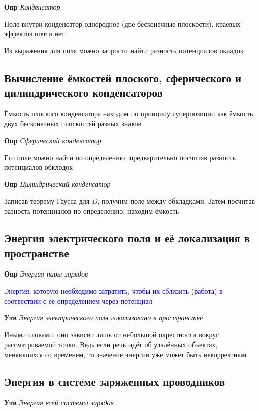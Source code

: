 \documentclass[a4paper, 14pt]{article}
\begin{document}
    \textbf{Опр} \textit{Конденсатор}
    
    Поле внутри конденсатор однородное (две бесконечные плоскости), краевых эффектов почти нет
    
    Из выражения для поля можно запросто найти разность потенциалов окладок
    
    \subsection{Вычисление ёмкостей плоского, сферического и цилиндрического конденсаторов}
    
    Ёмкость плоского конденсатора находим по принципу суперпозиции как ёмкость двух бесконечных плоскостей разных знаков
    
    \textbf{Опр} \textit{Сферический конденсатор}
    
    Его поле можно найти по определению, предварительно посчитав разность потенциалов обклодок
    
    \textbf{Опр} \textit{Цилиндрический конденсатор}
    
    Записав теорему Гаусса для $D$, получим поле между обкладками.
    Затем посчитав разность потенциалов по определению, находим ёмкость
    
    \subsection{Энергия электрического поля и её локализация в пространстве}
    
    \textbf{Опр} \textit{Энергия пары зарядов}
    
    \textcolor{blue}{Энергия, которую необходимо затратить, чтобы их сблизить (работа) в соотвествии с её
    определением через потенциал}
    
    \textbf{Утв} \textit{Энергия электрического поля локализовано в пространстве}
    
    Иными словами, оно зависит лишь от небольшой окрестности вокруг рассматриваемой точки.
    Ведь если речь идёт об удалённых объектах, меняющихся со временем, то значение энергии уже может быть некорректным
    
    \subsection{Энергия в системе заряженных проводников}
    
    \textbf{Утв} \textit{Энергия всей системы зарядов}
    
\end{document}
